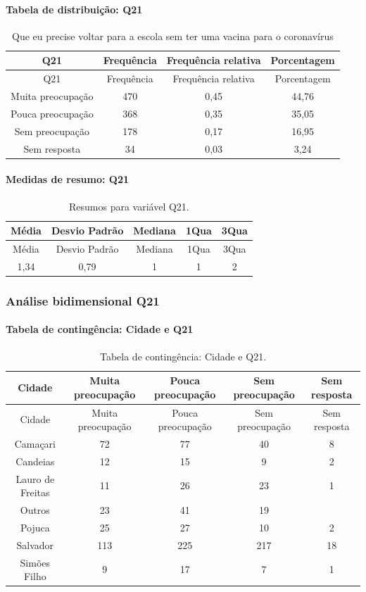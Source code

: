 \documentclass[]{article}
\let\oldparagraph\paragraph
\renewcommand{\paragraph}[1]{\oldparagraph{#1}\mbox{}}
\begin{document}
\hypertarget{tabela-de-distribuiuxe7uxe3o-q21}{%
\paragraph{Tabela de distribuição: Q21}\label{tabela-de-distribuiuxe7uxe3o-q21}}

\begin{longtable}[]{@{}cccc@{}}
\caption{\label{tab:unnamed-chunk-423}Que eu precise voltar para a escola sem ter uma vacina para o coronavírus}\tabularnewline
\toprule
Q21 & Frequência & Frequência relativa & Porcentagem\tabularnewline
\midrule
\endfirsthead
\toprule
Q21 & Frequência & Frequência relativa & Porcentagem\tabularnewline
\midrule
\endhead
Muita preocupação & 470 & 0,45 & 44,76\tabularnewline
Pouca preocupação & 368 & 0,35 & 35,05\tabularnewline
Sem preocupação & 178 & 0,17 & 16,95\tabularnewline
Sem resposta & 34 & 0,03 & 3,24\tabularnewline
\bottomrule
\end{longtable}

\hypertarget{medidas-de-resumo-q21}{%
\paragraph{Medidas de resumo: Q21}\label{medidas-de-resumo-q21}}

\begin{longtable}[]{@{}ccccc@{}}
\caption{\label{tab:unnamed-chunk-424}Resumos para variável Q21.}\tabularnewline
\toprule
Média & Desvio Padrão & Mediana & 1Qua & 3Qua\tabularnewline
\midrule
\endfirsthead
\toprule
Média & Desvio Padrão & Mediana & 1Qua & 3Qua\tabularnewline
\midrule
\endhead
1,34 & 0,79 & 1 & 1 & 2\tabularnewline
\bottomrule
\end{longtable}

\cleardoublepage

\hypertarget{anuxe1lise-bidimensional-q21}{%
\subsubsection{Análise bidimensional Q21}\label{anuxe1lise-bidimensional-q21}}

\hypertarget{tabela-de-continguxeancia-cidade-e-q21}{%
\paragraph{Tabela de contingência: Cidade e Q21}\label{tabela-de-continguxeancia-cidade-e-q21}}

\begin{longtable}[]{@{}ccccc@{}}
\caption{\label{tab:unnamed-chunk-425}Tabela de contingência: Cidade e Q21.}\tabularnewline
\toprule
Cidade & Muita preocupação & Pouca preocupação & Sem preocupação & Sem resposta\tabularnewline
\midrule
\endfirsthead
\toprule
Cidade & Muita preocupação & Pouca preocupação & Sem preocupação & Sem resposta\tabularnewline
\midrule
\endhead
Camaçari & 72 & 77 & 40 & 8\tabularnewline
Candeias & 12 & 15 & 9 & 2\tabularnewline
Lauro de Freitas & 11 & 26 & 23 & 1\tabularnewline
Outros & 23 & 41 & 19 &\tabularnewline
Pojuca & 25 & 27 & 10 & 2\tabularnewline
Salvador & 113 & 225 & 217 & 18\tabularnewline
Simões Filho & 9 & 17 & 7 & 1\tabularnewline
\bottomrule
\end{longtable}
\end{document}

